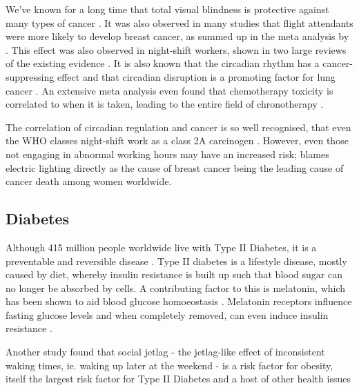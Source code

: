 We've known for a long time that total visual blindness is protective against many types of cancer \citep{hahnProfoundBilateralBlindness1991, feychtingReducedCancerIncidence1998, flynn-evansTotalVisualBlindness2009}. It was also observed in many studies that flight attendants were more likely to develop breast cancer, as summed up in the meta analysis by \citet{tokumaruIncidenceCancerFemale2006}. This effect was also observed in night-shift workers, shown in two large reviews of the existing evidence \citep{kolstadNightshiftWorkRisk2008, stevensLightatnightCircadianDisruption2009}. It is also known that the circadian rhythm has a cancer-suppressing effect \citep{fuCircadianClockPacemaker2003} and that circadian disruption is a promoting factor for lung cancer \citep{papagiannakopoulosCircadianRhythmDisruption2016}. An extensive meta analysis even found that chemotherapy toxicity is correlated to when it is taken, leading to the entire field of chronotherapy \citep{focanCircadianRhythmsCancer1995, dallmannChronopharmacologyNewInsights2014}.

The correlation of circadian regulation and cancer is so well recognised, that even the WHO classes night-shift work as a class 2A carcinogen \citep{whoBreastCancerConundrum2013}. However, even those not engaging in abnormal working hours may have an increased risk; \citet{stevensBreastCancerCircadian2014} blames electric lighting directly as the cause of breast cancer being the leading cause of cancer death among women worldwide.


\subsection{Diabetes}

Although 415 million people worldwide live with Type II Diabetes, it is a preventable and reversible disease \citep{fungDiabetesCodePrevent2018}. Type II diabetes is a lifestyle disease, mostly caused by diet, whereby insulin resistance is built up such that blood sugar can no longer be absorbed by cells. A contributing factor to this is melatonin, which has been shown to aid blood glucose homoeostasis \citep{bouatia-najiVariantMTNR1BAssociated2009}. Melatonin receptors influence fasting glucose levels \citep{prokopenkoVariantsMTNR1BInfluence2009} and when completely removed, can even induce insulin resistance \citep{contreras-alcantaraRemovalMelatoninReceptor2010}.

Another study found that social jetlag - the jetlag-like effect of inconsistent waking times, ie. waking up later at the weekend - is a risk factor for obesity, itself the largest risk factor for Type II Diabetes and a host of other health issues \citep{roennebergSocialJetlagObesity2012}


